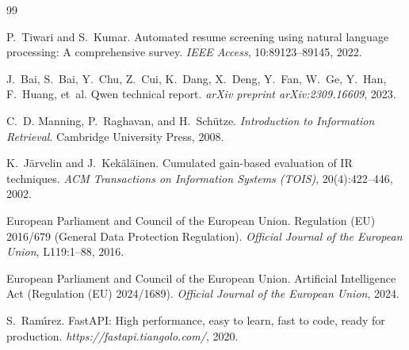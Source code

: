 \documentclass[11pt,a4paper]{report}
\begin{document}
\begin{thebibliography}{99}

P.~Tiwari and S.~Kumar.
\newblock Automated resume screening using natural language processing: A comprehensive survey.
\newblock \emph{IEEE Access}, 10:89123--89145, 2022.

J.~Bai, S.~Bai, Y.~Chu, Z.~Cui, K.~Dang, X.~Deng, Y.~Fan, W.~Ge, Y.~Han, F.~Huang, et~al.
\newblock Qwen technical report.
\newblock \emph{arXiv preprint arXiv:2309.16609}, 2023.

C.~D. Manning, P.~Raghavan, and H.~Sch{\"u}tze.
\newblock \emph{Introduction to Information Retrieval}.
\newblock Cambridge University Press, 2008.

K.~J{\"a}rvelin and J.~Kek{\"a}l{\"a}inen.
\newblock Cumulated gain-based evaluation of IR techniques.
\newblock \emph{ACM Transactions on Information Systems (TOIS)}, 20(4):422--446, 2002.

European Parliament and Council of the European Union.
\newblock Regulation (EU) 2016/679 (General Data Protection Regulation).
\newblock \emph{Official Journal of the European Union}, L119:1--88, 2016.

European Parliament and Council of the European Union.
\newblock Artificial Intelligence Act (Regulation (EU) 2024/1689).
\newblock \emph{Official Journal of the European Union}, 2024.

S.~Ram{\'\i}rez.
\newblock FastAPI: High performance, easy to learn, fast to code, ready for production.
\newblock \emph{https://fastapi.tiangolo.com/}, 2020.

\end{thebibliography}
\end{document}

